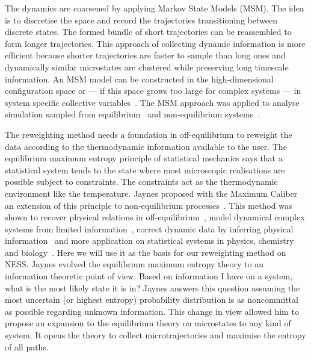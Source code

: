 
The dynamics are coarsened by applying Markov State Models (MSM). The idea is to discretise the space and record the trajectories transitioning between discrete states. The formed bundle of short trajectories can be reassembled to form longer trajectories. This approach of collecting dynamic information is more efficient because shorter trajectories are faster to sample than long ones and dynamically similar microstates are clustered  while preserving long timescale information. An MSM model can be constructed in the high-dimensional configuration space or --- if this space grows too large for complex systems --- in system specific collective variables~\cite{noe2017collective}. The MSM approach was applied to analyse simulation sampled from equilibrium~\cite{schwantes2013improvements} and non-equilibrium systems~\cite{knoch2017nonequilibrium,knoch2019non}.
 
The reweighting method needs a foundation in off-equilibrium to reweight the data according to the thermodynamic information available to the user. 
The equilibrium maximum entropy principle of statistical mechanics says that a statistical system tends to the state where most microscopic realisations are possible subject to constraints. The constraints act as the thermodynamic environment like the temperature. Jaynes proposed with the Maximum Caliber an extension of this principle to non-equilibrium processes~\cite{jaynes1985macroscopic}. This method was shown to recover physical relations in off-equilibrium~\cite{dixit2018perspective}, model dynamical complex systems from limited information~\cite{dixit2015inferring,dixit2018maximum}, correct dynamic data by inferring physical information~\cite{brotzakis2020method,meral2018efficient} and more application on statistical systems in physics, chemistry and biology~\cite{ghosh2020maximum}. Here we will use it as the basis for our reweighting method on NESS. Jaynes evolved the equilibrium maximum entropy theory to an information theoretic point of view: Based on information I have on a system, what is the most likely state it is in? Jaynes answers this question assuming the most uncertain (or highest entropy) probability distribution is as noncommittal as possible regarding unknown information. This change in view allowed him to propose an expansion to the equilibrium theory on microstates to any kind of system. It opens the theory to collect microtrajectories and maximise the entropy of all paths. 


